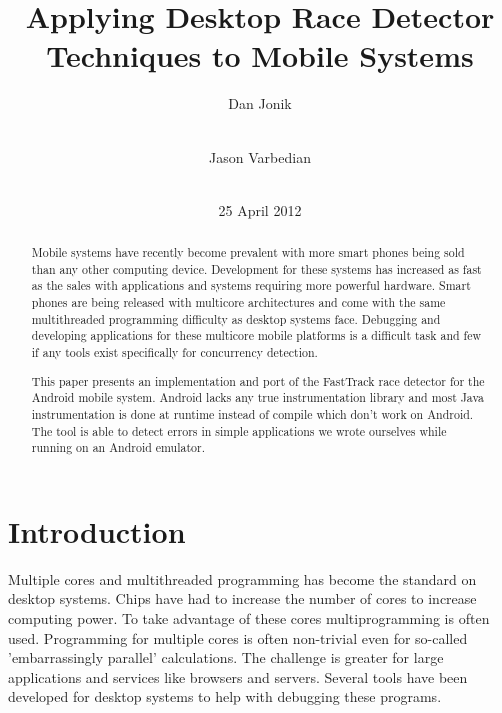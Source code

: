 \documentclass{acm_proc_article-sp}
\begin{document}
\title{Applying Desktop Race Detector Techniques to Mobile Systems}
\author{
\alignauthor Dan Jonik\\
\\
\and
\alignauthor Jason Varbedian\\
\\
}
\date{25 April 2012}
\maketitle

\begin{abstract}
Mobile systems have recently become prevalent with more smart phones being sold than any other computing device. Development for these systems has increased as fast as the sales with applications and systems requiring more powerful hardware. Smart phones are being released with multicore architectures and come with the same multithreaded programming difficulty as desktop systems face. Debugging and developing applications for these multicore mobile platforms is a difficult task and few if any tools exist specifically for concurrency detection.
 
This paper presents an implementation and port of the FastTrack race detector for the Android mobile system. Android lacks any true instrumentation library and most Java instrumentation is done at runtime instead of compile which don't work on Android. The tool is able to detect errors in simple applications we wrote ourselves while running on an Android emulator. 
\end{abstract}

\section{Introduction}
Multiple cores and multithreaded programming has become the standard on desktop systems. Chips have had to increase the number of cores to increase computing power. To take advantage of these cores multiprogramming is often used. Programming for multiple cores is often non-trivial even for so-called 'embarrassingly parallel' calculations. The challenge is greater for large applications and services like browsers and servers. Several tools have been developed for desktop systems to help with debugging these programs.
 
\end{document}
